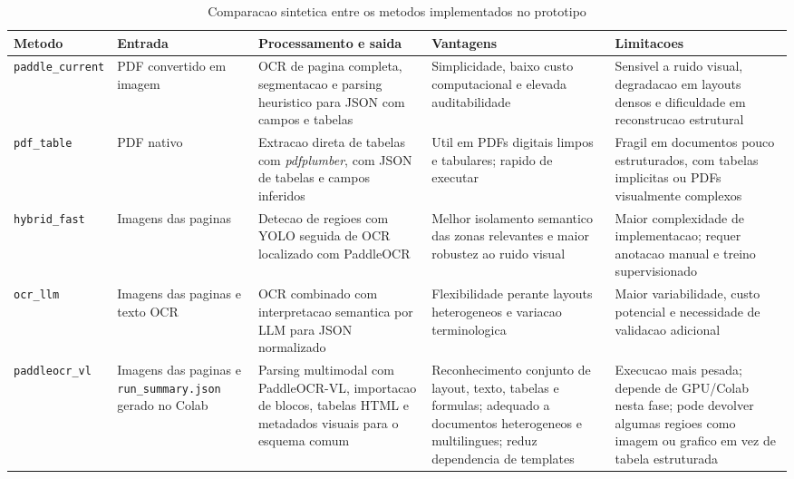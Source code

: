 \begin{table}[htbp]
\centering
\caption{Comparacao sintetica entre os metodos implementados no prototipo}
\label{tab:metodosimplementados}
\scriptsize
\setlength{\tabcolsep}{3pt}
\begin{tabular}{p{2.3cm} p{2.0cm} p{3.1cm} p{3.0cm} p{3.1cm}}
\hline
\textbf{Metodo} & \textbf{Entrada} & \textbf{Processamento e saida} & \textbf{Vantagens} & \textbf{Limitacoes} \\
\hline
\texttt{paddle\_current} & PDF convertido em imagem & OCR de pagina completa, segmentacao e parsing heuristico para JSON com campos e tabelas & Simplicidade, baixo custo computacional e elevada auditabilidade & Sensivel a ruido visual, degradacao em layouts densos e dificuldade em reconstrucao estrutural \\
\texttt{pdf\_table} & PDF nativo & Extracao direta de tabelas com \textit{pdfplumber}, com JSON de tabelas e campos inferidos & Util em PDFs digitais limpos e tabulares; rapido de executar & Fragil em documentos pouco estruturados, com tabelas implicitas ou PDFs visualmente complexos \\
\texttt{hybrid\_fast} & Imagens das paginas & Detecao de regioes com YOLO seguida de OCR localizado com PaddleOCR & Melhor isolamento semantico das zonas relevantes e maior robustez ao ruido visual & Maior complexidade de implementacao; requer anotacao manual e treino supervisionado \\
\texttt{ocr\_llm} & Imagens das paginas e texto OCR & OCR combinado com interpretacao semantica por LLM para JSON normalizado & Flexibilidade perante layouts heterogeneos e variacao terminologica & Maior variabilidade, custo potencial e necessidade de validacao adicional \\
\texttt{paddleocr\_vl} & Imagens das paginas e \texttt{run\_summary.json} gerado no Colab & Parsing multimodal com PaddleOCR-VL, importacao de blocos, tabelas HTML e metadados visuais para o esquema comum & Reconhecimento conjunto de layout, texto, tabelas e formulas; adequado a documentos heterogeneos e multilingues; reduz dependencia de templates & Execucao mais pesada; depende de GPU/Colab nesta fase; pode devolver algumas regioes como imagem ou grafico em vez de tabela estruturada \\
\hline
\end{tabular}
\end{table}


